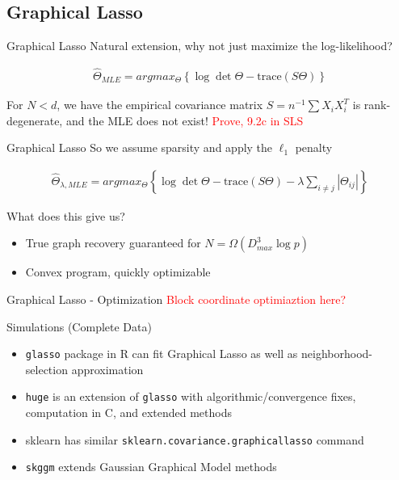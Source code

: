 \documentclass{beamer}
\begin{document}
\subsection{Graphical Lasso}

\begin{frame}{Graphical Lasso}
Natural extension, why not just maximize the log-likelihood?

\begin{gather*}
    \hat{\Theta}_{MLE}
    =
    argmax_\Theta
    \left\{
        \log \det \Theta - \text{trace}(S\Theta)
    \right\}
\end{gather*}

For $N<d$, we have the empirical covariance matrix $S = n^{-1}\sum X_i X_i^T$ is rank-degenerate, and the MLE does not exist! \textcolor{red}{Prove, 9.2c in SLS}

\end{frame}



\begin{frame}{Graphical Lasso}
So we assume sparsity and apply the $\ell_1$ penalty

\begin{gather*}
    \hat{\Theta}_{\lambda, MLE}
    =
    argmax_\Theta
    \left\{
        \log \det \Theta - \text{trace}(S\Theta)
        -
        \lambda \sum_{i\neq j} |\Theta_{ij}|
    \right\}
\end{gather*}

What does this give us? 
\begin{itemize}
    \item True graph recovery guaranteed for $N=\Omega(D_{max}^3\log p)$
    \item Convex program, quickly optimizable 
\end{itemize}
\end{frame}

\begin{frame}{Graphical Lasso - Optimization}
    \textcolor{red}{Block coordinate optimiaztion here?}
\end{frame}

\begin{frame}{Simulations (Complete Data)}
    \begin{itemize}
        \item \texttt{glasso} package in R can fit Graphical Lasso as well as neighborhood-selection approximation 
        \item \texttt{huge} is an extension of \texttt{glasso} with algorithmic/convergence fixes, computation in C, and extended methods
        \item sklearn has similar \texttt{sklearn.covariance.graphicallasso} command 
        \item \texttt{skggm} extends Gaussian Graphical Model methods  %
    \end{itemize}
\end{frame}
\end{document}
